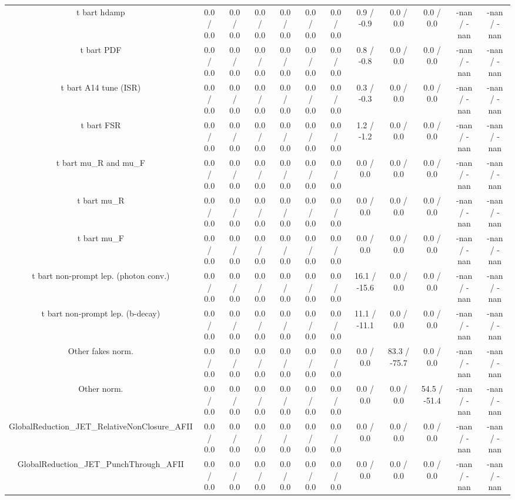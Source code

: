\begin{table}[htbp]
\begin{center}
\begin{tabular}{|c|c|c|c|c|c|c|c|c|c|c|c|}
  t bar{t} hdamp & 0.0 / 0.0 & 0.0 / 0.0 & 0.0 / 0.0 & 0.0 / 0.0 & 0.0 / 0.0 & 0.0 / 0.0 & 0.9 / -0.9 & 0.0 / 0.0 & 0.0 / 0.0 & -nan / -nan & -nan / -nan \\ 
  t bar{t} PDF & 0.0 / 0.0 & 0.0 / 0.0 & 0.0 / 0.0 & 0.0 / 0.0 & 0.0 / 0.0 & 0.0 / 0.0 & 0.8 / -0.8 & 0.0 / 0.0 & 0.0 / 0.0 & -nan / -nan & -nan / -nan \\ 
  t bar{t} A14 tune (ISR) & 0.0 / 0.0 & 0.0 / 0.0 & 0.0 / 0.0 & 0.0 / 0.0 & 0.0 / 0.0 & 0.0 / 0.0 & 0.3 / -0.3 & 0.0 / 0.0 & 0.0 / 0.0 & -nan / -nan & -nan / -nan \\ 
  t bar{t} FSR & 0.0 / 0.0 & 0.0 / 0.0 & 0.0 / 0.0 & 0.0 / 0.0 & 0.0 / 0.0 & 0.0 / 0.0 & 1.2 / -1.2 & 0.0 / 0.0 & 0.0 / 0.0 & -nan / -nan & -nan / -nan \\ 
  t bar{t}  mu_{R} and  mu_{F} & 0.0 / 0.0 & 0.0 / 0.0 & 0.0 / 0.0 & 0.0 / 0.0 & 0.0 / 0.0 & 0.0 / 0.0 & 0.0 / 0.0 & 0.0 / 0.0 & 0.0 / 0.0 & -nan / -nan & -nan / -nan \\ 
  t bar{t}  mu_{R} & 0.0 / 0.0 & 0.0 / 0.0 & 0.0 / 0.0 & 0.0 / 0.0 & 0.0 / 0.0 & 0.0 / 0.0 & 0.0 / 0.0 & 0.0 / 0.0 & 0.0 / 0.0 & -nan / -nan & -nan / -nan \\ 
  t bar{t}  mu_{F} & 0.0 / 0.0 & 0.0 / 0.0 & 0.0 / 0.0 & 0.0 / 0.0 & 0.0 / 0.0 & 0.0 / 0.0 & 0.0 / 0.0 & 0.0 / 0.0 & 0.0 / 0.0 & -nan / -nan & -nan / -nan \\ 
  t bar{t} non-prompt lep. (photon conv.) & 0.0 / 0.0 & 0.0 / 0.0 & 0.0 / 0.0 & 0.0 / 0.0 & 0.0 / 0.0 & 0.0 / 0.0 & 16.1 / -15.6 & 0.0 / 0.0 & 0.0 / 0.0 & -nan / -nan & -nan / -nan \\ 
  t bar{t} non-prompt lep. (b-decay) & 0.0 / 0.0 & 0.0 / 0.0 & 0.0 / 0.0 & 0.0 / 0.0 & 0.0 / 0.0 & 0.0 / 0.0 & 11.1 / -11.1 & 0.0 / 0.0 & 0.0 / 0.0 & -nan / -nan & -nan / -nan \\ 
  Other fakes norm. & 0.0 / 0.0 & 0.0 / 0.0 & 0.0 / 0.0 & 0.0 / 0.0 & 0.0 / 0.0 & 0.0 / 0.0 & 0.0 / 0.0 & 83.3 / -75.7 & 0.0 / 0.0 & -nan / -nan & -nan / -nan \\ 
  Other norm. & 0.0 / 0.0 & 0.0 / 0.0 & 0.0 / 0.0 & 0.0 / 0.0 & 0.0 / 0.0 & 0.0 / 0.0 & 0.0 / 0.0 & 0.0 / 0.0 & 54.5 / -51.4 & -nan / -nan & -nan / -nan \\ 
  GlobalReduction_JET_RelativeNonClosure_AFII & 0.0 / 0.0 & 0.0 / 0.0 & 0.0 / 0.0 & 0.0 / 0.0 & 0.0 / 0.0 & 0.0 / 0.0 & 0.0 / 0.0 & 0.0 / 0.0 & 0.0 / 0.0 & -nan / -nan & -nan / -nan \\ 
  GlobalReduction_JET_PunchThrough_AFII & 0.0 / 0.0 & 0.0 / 0.0 & 0.0 / 0.0 & 0.0 / 0.0 & 0.0 / 0.0 & 0.0 / 0.0 & 0.0 / 0.0 & 0.0 / 0.0 & 0.0 / 0.0 & -nan / -nan & -nan / -nan \\ 

\end{tabular}
\end{center}
\end{table}

